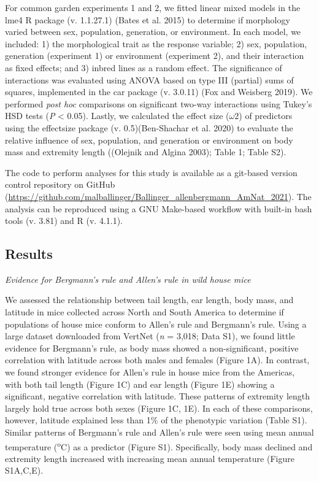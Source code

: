 \documentclass[
]{article}
\begin{document}
For common garden experiments 1 and 2, we fitted linear mixed models in
the lme4 R package (v. 1.1.27.1) (Bates et al. 2015) to determine if
morphology varied between sex, population, generation, or environment.
In each model, we included: 1) the morphological trait as the response
variable; 2) sex, population, generation (experiment 1) or environment
(experiment 2), and their interaction as fixed effects; and 3) inbred
lines as a random effect. The significance of interactions was evaluated
using ANOVA based on type III (partial) sums of squares, implemented in
the car package (v. 3.0.11) (Fox and Weisberg 2019). We performed
\emph{post hoc} comparisons on significant two-way interactions using
Tukey's HSD tests (\emph{P} \textless{} 0.05). Lastly, we calculated the
effect size (\(\omega2\)) of predictors using the effectsize package (v.
0.5)(Ben-Shachar et al. 2020) to evaluate the relative influence of sex,
population, and generation or environment on body mass and extremity
length ((Olejnik and Algina 2003); Table 1; Table S2).

The code to perform analyses for this study is available as a git-based
version control repository on GitHub
(\url{https://github.com/malballinger/Ballinger_allenbergmann_AmNat_2021}).
The analysis can be reproduced using a GNU Make-based workflow with
built-in bash tools (v. 3.81) and R (v. 4.1.1).

\vspace{5mm}

\hypertarget{results}{%
\subsection{Results}\label{results}}

\noindent\emph{Evidence for Bergmann's rule and Allen's rule in wild
house mice}

We assessed the relationship between tail length, ear length, body mass,
and latitude in mice collected across North and South America to
determine if populations of house mice conform to Allen's rule and
Bergmann's rule. Using a large dataset downloaded from VertNet (\emph{n}
= 3,018; Data S1), we found little evidence for Bergmann's rule, as body
mass showed a non-significant, positive correlation with latitude across
both males and females (Figure 1A). In contrast, we found stronger
evidence for Allen's rule in house mice from the Americas, with both
tail length (Figure 1C) and ear length (Figure 1E) showing a
significant, negative correlation with latitude. These patterns of
extremity length largely hold true across both sexes (Figure 1C, 1E). In
each of these comparisons, however, latitude explained less than 1\% of
the phenotypic variation (Table S1). Similar patterns of Bergmann's rule
and Allen's rule were seen using mean annual temperature
(\textsuperscript{o}C) as a predictor (Figure S1). Specifically, body
mass declined and extremity length increased with increasing mean annual
temperature (Figure S1A,C,E).
\end{document}
